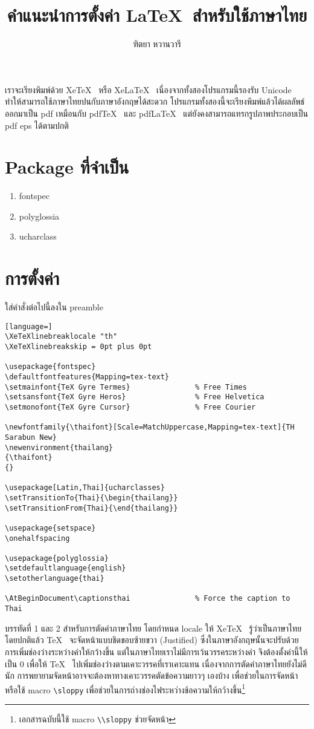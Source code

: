 \documentclass[a4paper,11pt]{article}
\title{คำแนะนำการตั้งค่า \LaTeX~สำหรับใช้ภาษาไทย}
\author{ฑิตยา หวานวารี}
\makeatletter
\newenvironment{thailang}
{\thaifont}
{}
\def\thaialph#1{\expandafter\thalph\csname c@#1\endcsname}
\def\thalph#1{%
    \ifcase#1\or ก\or ข\or ค\or ง\or จ\or ฉ\or ช\or ซ\or
    ฌ\or ญ\or ฎ\or ฏ\or ฐ\or ฑ\or ฒ\or ณ\or ด\or ต\or ถ\or ท\or ธ\or น\or
    บ\or ป\or ผ\or ฝ\or พ\or ฟ\or ภ\or ม\or ย\or ร\or ฤ\or ล\or ฦ\or ว\or
    ศ\or ษ\or ส\or ห\or ฬ\or อ\else ฮ\else\xpg@ill@value{#1}{thalph}\fi}
\makeatother
\begin{document}
    \maketitle

    เราจะเรียงพิมพ์ด้วย Xe\TeX~ หรือ Xe\LaTeX~ เนื่องจากทั้งสองโปรแกรมนี้รองรับ Unicode ทำให้สามารถใช้ภาษาไทยปนกับภาษาอังกฤษได้สะดวก โปรแกรมทั้งสองนี้จะเรียงพิมพ์แล้วได้ผลลัพธ์ออกมาเป็น pdf เหมือนกับ pdf\TeX~ และ pdf\LaTeX~ แต่ยังคงสามารถแทรกรูปภาพประกอบเป็น pdf eps ได้ตามปกติ

\section{Package ที่จำเป็น}
\renewcommand{\theenumi}{\thaialph{enumi}}
\begin{enumerate}
    \item fontspec
    \item polyglossia
    \item ucharclass
\end{enumerate}

\section{การตั้งค่า}
ใส่คำสั่งต่อไปนี้ลงใน preamble
\begin{lstlisting}[language=]
\XeTeXlinebreaklocale "th"
\XeTeXlinebreakskip = 0pt plus 0pt

\usepackage{fontspec}
\defaultfontfeatures{Mapping=tex-text}
\setmainfont{TeX Gyre Termes}				% Free Times
\setsansfont{TeX Gyre Heros}				% Free Helvetica
\setmonofont{TeX Gyre Cursor}				% Free Courier

\newfontfamily{\thaifont}[Scale=MatchUppercase,Mapping=tex-text]{TH Sarabun New}
\newenvironment{thailang}
{\thaifont}
{}

\usepackage[Latin,Thai]{ucharclasses}
\setTransitionTo{Thai}{\begin{thailang}}
\setTransitionFrom{Thai}{\end{thailang}}

\usepackage{setspace}
\onehalfspacing

\usepackage{polyglossia}
\setdefaultlanguage{english}
\setotherlanguage{thai}

\AtBeginDocument\captionsthai               % Force the caption to Thai
\end{lstlisting}

บรรทัดที่ 1 และ 2 สำหรับการตัดคำภาษาไทย โดยกำหนด locale ให้ Xe\TeX~ รู้ว่าเป็นภาษาไทย
โดยปกติแล้ว \TeX~ จะจัดหน้าแบบชิดขอบซ้ายขวา (Justified) ซึ่งในภาษาอังกฤษนั้นจะปรับด้วยการเพิ่มช่องว่างระหว่างคำให้กว้างขึ้น แต่ในภาษาไทยเราไม่มีการเว้นวรรคระหว่างคำ จึงต้องตั้งค่านี้ให้เป็น 0 เพื่อให้ \TeX~ ไปเพิ่มช่องว่างตามเคาะวรรคที่เราเคาะแทน เนื่องจากการตัดคำภาษาไทยยังไม่ดีนัก การพยายามจัดหน้าอาจจะต้องหาทางเคาะวรรคตัดข้อความยาวๆ เองบ้าง เพื่อช่วยในการจัดหน้า หรือใช้ macro \lstinline|\sloppy| เพื่อช่วยในการถ่างช่องไฟระหว่างข้อความให้กว้างขึ้น\footnote{เอกสารฉบับนี้ใช้ macro \lstinline|\\sloppy| ช่วยจัดหน้า}
\end{document}
